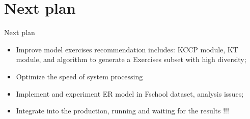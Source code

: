 \documentclass[10pt,a4paper,openany]{beamer}
\begin{document}
	\section{Next plan}
	\begin{frame}{Next plan}
		\begin{itemize}
			\item Improve model exercises recommendation includes: KCCP module, KT module, and algorithm to generate a Exercises subset with high diversity;
			\item Optimize the speed of system processing
			\item Implement and experiment ER model in Fschool dataset, analysis issues;
			\item Integrate into the production, running and waiting for the results !!!
		\end{itemize}
	\end{frame}
	
	
\end{document}

